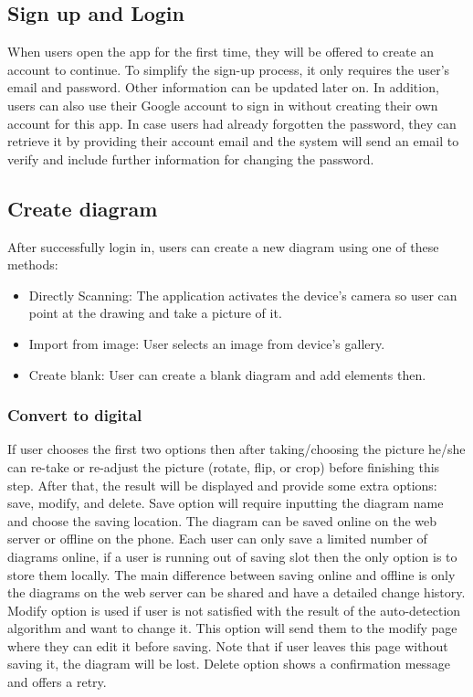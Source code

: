 \subsection{Sign up and Login}
When users open the app for the first time, they will be offered to create an account to continue. To simplify the sign-up process, it only requires the user's email and password. Other information can be updated later on. In addition, users can also use their Google account to sign in without creating their own account for this app. In case users had already forgotten the password, they can retrieve it by providing their account email and the system will send an email to verify and include further information for changing the password.

\subsection{Create diagram}
After successfully login in, users can create a new diagram using one of these methods:
\begin{itemize}
    \item Directly Scanning: The application activates the device's camera so user can point at the drawing and take a picture of it.
    \item Import from image: User selects an image from device's gallery.
    \item Create blank: User can create a blank diagram and add elements then.
\end{itemize}

\subsubsection{Convert to digital}
If user chooses the first two options then after taking/choosing the picture he/she can re-take or re-adjust the picture (rotate, flip, or crop) before finishing this step. After that, the result will be displayed and provide some extra options: save, modify, and delete. Save option will require inputting the diagram name and choose the saving location. The diagram can be saved online on the web server or offline on the phone. Each user can only save a limited number of diagrams online, if a user is running out of saving slot then the only option is to store them locally. The main difference between saving online and offline is only the diagrams on the web server can be shared and have a detailed change history. Modify option is used if user is not satisfied with the result of the auto-detection algorithm and want to change it. This option will send them to the modify page where they can edit it before saving. Note that if user leaves this page without saving it, the diagram will be lost. Delete option shows a confirmation message and offers a retry.

